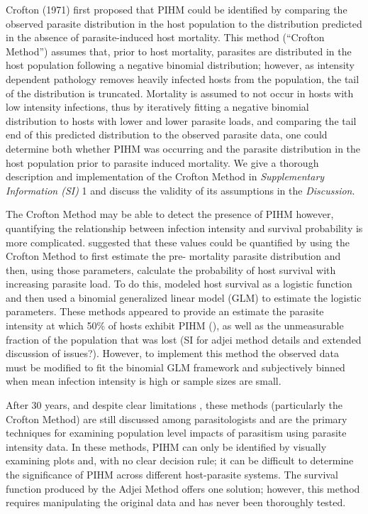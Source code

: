 \documentclass[12pt, a4paper]{article}
\begin{document}
Crofton (1971) first proposed that PIHM could be identified by comparing the
observed parasite distribution in the host population to the distribution
predicted in the absence of parasite-induced host mortality. This method
(“Crofton Method”) assumes that, prior to host mortality, parasites are
distributed in the host population following a negative binomial distribution;
however, as intensity dependent pathology removes heavily infected hosts from
the population, the tail of the distribution is truncated. Mortality is assumed
to not occur in hosts with low intensity infections, thus by iteratively
fitting a negative binomial distribution to hosts with lower and lower parasite
loads, and comparing the tail end of this predicted distribution to the
observed parasite data, one could determine both whether PIHM was occurring and
the parasite distribution in the host population prior to parasite induced
mortality. We give a thorough description and implementation of the Crofton
Method in \emph{Supplementary Information (SI)} 1 and discuss the validity of
its assumptions in the \emph{Discussion}.

The Crofton Method may be able to detect the presence of PIHM however,
quantifying the relationship between infection intensity and survival
probability is more complicated. \cite{Adjei1986} suggested that these values
could be quantified by using the Crofton Method to first estimate the pre-
mortality parasite distribution and then, using those parameters, calculate the
probability of host survival with increasing parasite load. To do this,
\cite{Adjei1986} modeled host survival as a logistic function and then used a
binomial generalized linear model (GLM) to estimate the logistic parameters.
These methods appeared to provide an estimate the parasite intensity at which
50\% of hosts exhibit PIHM (), as well as the unmeasurable fraction of the
population that was lost (SI for adjei method details and extended discussion
of issues?). However, to implement this method the observed data must be
modified to fit the binomial GLM framework and subjectively binned when mean
infection intensity is high or sample sizes are small.

After 30 years, and despite clear limitations \citep{McCallum2000a}, these
methods (particularly the Crofton Method) are still discussed among
parasitologists and are the primary techniques for examining population level
impacts of parasitism using parasite intensity data. In these methods, PIHM can
only be identified by visually examining plots and, with no clear decision
rule; it can be difficult to determine the significance of PIHM across
different host-parasite systems. The survival function produced by the Adjei
Method offers one solution; however, this method requires manipulating the
original data and has never been thoroughly tested.
\end{document}
